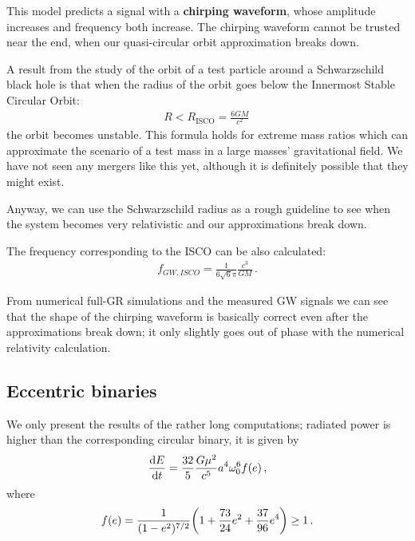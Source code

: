 \documentclass[main.tex]{subfiles}
\begin{document}
This model predicts a signal with a \textbf{chirping waveform}, whose amplitude increases and frequency both increase.
The chirping waveform cannot be trusted near the end, when our quasi-circular orbit approximation breaks down. 

A result from the study of the orbit of a test particle around a Schwarzschild black hole is that when the radius of the orbit goes below the Innermost Stable Circular Orbit:
%
\begin{align}
R < R _{\text{ISCO}} = \frac{6GM}{c^2}
\,
\end{align}
%
the orbit becomes unstable.
This formula holds for extreme mass ratios which can approximate the scenario of a test mass in a large masses' gravitational field. 
We have not seen any mergers like this yet, although it is definitely possible that they might exist.
 
Anyway, we can use the Schwarzschild radius as a rough guideline to see when the system becomes very relativistic and our approximations break down.

The frequency corresponding to the ISCO can be also calculated: 
%
\begin{align}
f_{GW, ISCO} = \frac{1}{6 \sqrt{6} \pi } \frac{c^3}{GM}
\,.
\end{align}

From numerical full-GR simulations and the measured GW signals we can see that the shape of the chirping waveform is basically correct even after the approximations break down; it only slightly goes out of phase with the numerical relativity calculation. 


\subsection{Eccentric binaries}

We only present the results of the rather long computations; radiated power is higher than the corresponding circular binary, it is given by
%
\begin{align}
\dv{E}{t} = \frac{32}{5} \frac{G \mu^2}{c^{5}} a^{4} \omega_0^{6} f(e)
\,,
\end{align}
%
where 
%
\begin{align}
f(e) = \frac{1}{(1 - e^2)^{7/2}} \qty(1 + \frac{73}{24} e^2 + \frac{37}{96} e^{4}) \geq 1 
\,.
\end{align}
\end{document}
